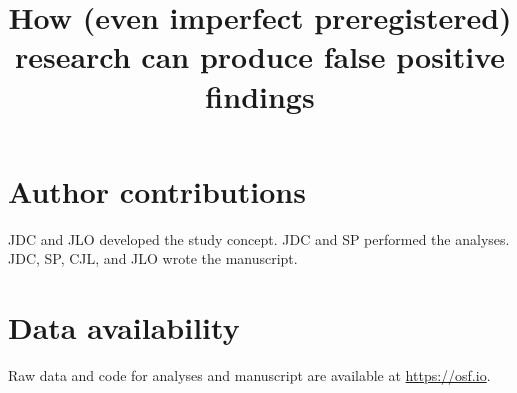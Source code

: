 \documentclass[english,natbib,man,floatsintext]{apa6}
\title{How (even imperfect preregistered) research can produce false positive findings}
\begin{document}
\maketitle









\section{Author contributions}
JDC and JLO developed the study concept. JDC and SP performed the analyses. JDC, SP, CJL, and JLO wrote the manuscript. 

\section{Data availability}
Raw data and code for analyses and manuscript are available at \url{https://osf.io}.



\clearpage

 
\end{document}
